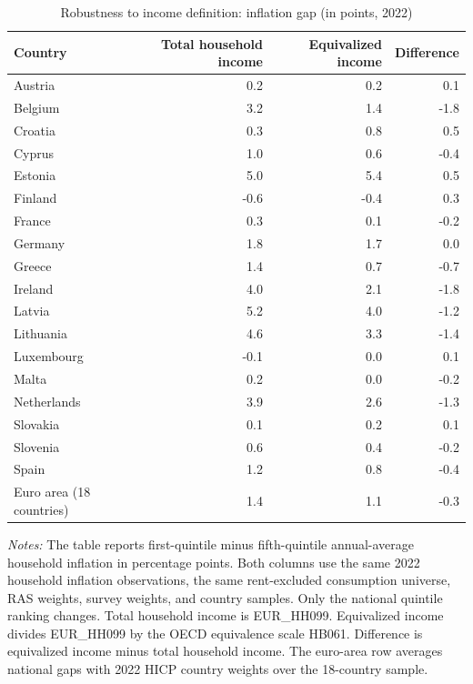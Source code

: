 \begin{table}[!htbp]
\small
\setlength{\tabcolsep}{5pt}

\caption{\label{tab:income-definition-robustness}Robustness to income definition: inflation gap (in points, 2022)}
\centering
\begin{tabular}[t]{lrrr}
\toprule
Country & Total household income & Equivalized income & Difference\\
\midrule
Austria & 0.2 & 0.2 & 0.1\\
Belgium & 3.2 & 1.4 & -1.8\\
Croatia & 0.3 & 0.8 & 0.5\\
Cyprus & 1.0 & 0.6 & -0.4\\
Estonia & 5.0 & 5.4 & 0.5\\
\addlinespace
Finland & -0.6 & -0.4 & 0.3\\
France & 0.3 & 0.1 & -0.2\\
Germany & 1.8 & 1.7 & 0.0\\
Greece & 1.4 & 0.7 & -0.7\\
Ireland & 4.0 & 2.1 & -1.8\\
\addlinespace
Latvia & 5.2 & 4.0 & -1.2\\
Lithuania & 4.6 & 3.3 & -1.4\\
Luxembourg & -0.1 & 0.0 & 0.1\\
Malta & 0.2 & 0.0 & -0.2\\
Netherlands & 3.9 & 2.6 & -1.3\\
\addlinespace
Slovakia & 0.1 & 0.2 & 0.1\\
Slovenia & 0.6 & 0.4 & -0.2\\
Spain & 1.2 & 0.8 & -0.4\\
Euro area (18 countries) & 1.4 & 1.1 & -0.3\\
\bottomrule
\end{tabular}
\begin{flushleft}
\footnotesize{\emph{Notes:} The table reports first-quintile minus fifth-quintile annual-average household inflation in percentage points. Both columns use the same 2022 household inflation observations, the same rent-excluded consumption universe, RAS weights, survey weights, and country samples. Only the national quintile ranking changes. Total household income is EUR\_HH099. Equivalized income divides EUR\_HH099 by the OECD equivalence scale HB061. Difference is equivalized income minus total household income. The euro-area row averages national gaps with 2022 HICP country weights over the 18-country sample.}
\end{flushleft}
\end{table}
